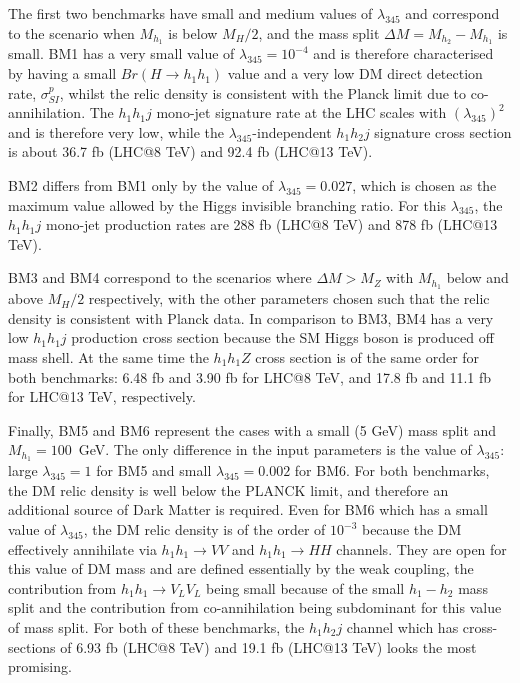 \documentclass[12pt,a4paper]{article}
\begin{document}
The first two benchmarks have small and medium values of $\lambda_{345}$ and correspond to the 
scenario when $M_{h_1}$ is below $M_H/2$, and the mass split $\Delta M = M_{h_2}-M_{h_1}$ is small.
BM1 has a very small value of  $\lambda_{345}=10^{-4}$ and is therefore characterised 
by having a small $Br(H\to h_1 h_1)$ value and a very low DM direct detection rate, $\sigma^p_{SI}$,
whilst the relic density is consistent with the Planck limit {due to co-annihilation}.
The $h_1h_1j$ mono-jet signature rate at the LHC scales with $(\lambda_{345})^2$ and is therefore very low,
while the $\lambda_{345}$-independent $h_1h_2j$ signature cross section 
is about 36.7 fb (LHC@8 TeV) and 92.4 fb (LHC@13 TeV).

BM2 differs from BM1 only by the value of $\lambda_{345}=0.027$, which is chosen as the maximum value 
allowed by the Higgs invisible branching ratio. For this $\lambda_{345}$,
the $h_1 h_1 j$ mono-jet production rates are 288 fb (LHC@8 TeV) and 878 fb (LHC@13 TeV).

BM3 and BM4 correspond to the scenarios where $\Delta M > M_Z$
with $M_{h_1}$ below and above $M_H/2$ respectively,
{with the other parameters chosen such that the} relic density is consistent with Planck data.
In comparison to BM3, BM4 has a very low $h_1h_1j$ production cross section because
the SM Higgs boson is produced off mass shell.
At the same time the $h_1 h_1 Z$ cross section 
is of the same order for both benchmarks: 6.48 fb and 3.90 fb for LHC@8 TeV,
and 17.8 fb and 11.1 fb for LHC@13 TeV, respectively.

Finally, BM5 and BM6 represent the cases with a small (5 GeV) mass split and $M_{h_1}=100$~GeV.
The only difference in the input parameters is the value of $\lambda_{345}$: 
large $\lambda_{345}=1$ for BM5 and small $\lambda_{345}=0.002$ for BM6.
For both benchmarks, the DM relic density is well below the PLANCK limit, and therefore an
additional source of Dark Matter is required. Even for BM6 which has a small
value of $\lambda_{345}$, the DM relic density is
of the order of $10^{-3}$ because the DM effectively annihilate via 
$h_1 h_1 \to VV$  and $h_1 h_1 \to HH$ channels.
They are open for this value of DM mass
and are defined essentially by the weak coupling,
the contribution from $h_1 h_1 \to V_L V_L$ being small because of the small $h_1-h_2$ mass split
and the contribution from co-annihilation being subdominant for this value of mass split.
For both of these benchmarks, the $h_1 h_2 j$ channel
which has cross-sections of 6.93 fb (LHC@8 TeV) and 19.1 fb (LHC@13 TeV)
looks the most promising.
\end{document}
